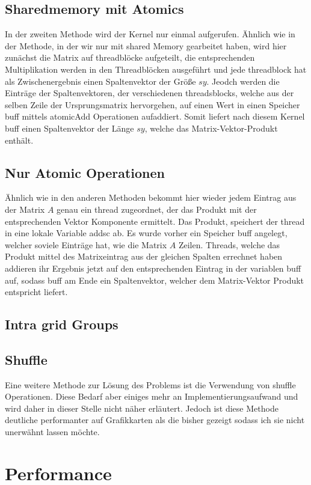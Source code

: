 \documentclass[10pt,a4paper]{article}
\begin{document}
	 \subsection{Sharedmemory mit Atomics}
	 In der zweiten Methode wird der Kernel nur einmal aufgerufen. Ähnlich wie in der Methode, in der wir nur mit shared Memory gearbeitet haben, wird hier zunächst die Matrix auf threadblöcke aufgeteilt, die entsprechenden Multiplikation werden in den Threadblöcken ausgeführt und jede threadblock hat als Zwischenergebnis einen Spaltenvektor der Größe $sy$. Jeodch werden die Einträge der Spaltenvektoren, der verschiedenen threadsblocks, welche aus der selben Zeile der Ursprungsmatrix hervorgehen, auf einen Wert in einen Speicher buff mittels atomicAdd Operationen aufaddiert. Somit liefert nach diesem Kernel buff einen Spaltenvektor der Länge $sy$, welche das Matrix-Vektor-Produkt enthält.
	 \subsection{Nur Atomic Operationen}
	 Ähnlich wie in den anderen Methoden bekommt hier wieder jedem Eintrag aus der Matrix $A$ genau ein thread zugeordnet, der das Produkt mit der entsprechenden Vektor Komponente ermittelt. Das Produkt, speichert der thread in eine lokale Variable addsc ab. Es wurde vorher ein Speicher buff angelegt, welcher soviele Einträge hat, wie die Matrix $A$ Zeilen. Threads, welche das Produkt mittel des Matrixeintrag aus der gleichen Spalten errechnet haben addieren ihr Ergebnis jetzt auf den entsprechenden Eintrag in der variablen buff auf, sodass buff am Ende ein Spaltenvektor, welcher dem Matrix-Vektor Produkt entspricht liefert.
	 \subsection{Intra grid Groups}  
	 
	 \subsection{Shuffle}
	 Eine weitere Methode zur Lösung des Problems ist die Verwendung von shuffle Operationen. Diese Bedarf aber einiges mehr an Implementierungsaufwand und wird daher in dieser Stelle nicht näher erläutert. Jedoch ist diese Methode deutliche performanter auf Grafikkarten als die bisher gezeigt sodass ich sie nicht unerwähnt lassen möchte.

	 \section{Performance}
\end{document}
